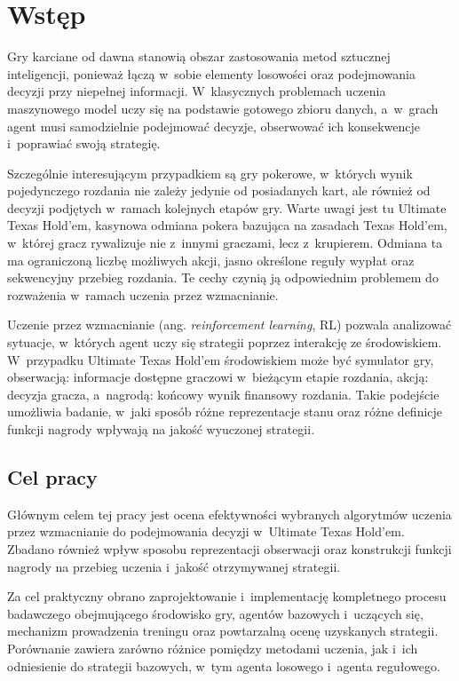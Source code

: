 \chapter{Wstęp}

Gry karciane od dawna stanowią obszar zastosowania metod sztucznej
inteligencji, ponieważ łączą w~sobie elementy losowości oraz podejmowania decyzji przy niepełnej informacji.
W~klasycznych problemach uczenia maszynowego model uczy się na podstawie gotowego zbioru danych,
a~w~grach agent musi samodzielnie podejmować decyzje, obserwować ich konsekwencje i~poprawiać swoją strategię.

Szczególnie interesującym przypadkiem są gry pokerowe, w~których wynik
pojedynczego rozdania nie zależy jedynie od posiadanych kart, ale również od decyzji
podjętych w~ramach kolejnych etapów gry. Warte uwagi jest tu Ultimate Texas Hold’em, kasynowa odmiana pokera bazująca na zasadach Texas Hold’em, w~której gracz rywalizuje
nie z~innymi graczami, lecz z~krupierem. Odmiana ta ma ograniczoną liczbę możliwych akcji,
jasno określone reguły wypłat oraz sekwencyjny przebieg rozdania. Te cechy
czynią ją odpowiednim problemem do rozważenia w~ramach uczenia przez wzmacnianie.

Uczenie przez wzmacnianie (ang. \emph{reinforcement learning}, RL) pozwala
analizować sytuacje, w~których agent uczy się strategii poprzez interakcję ze
środowiskiem. W~przypadku Ultimate Texas Hold’em środowiskiem może być symulator
gry, obserwacją: informacje dostępne graczowi w~bieżącym etapie rozdania, akcją:
decyzja gracza, a~nagrodą: końcowy wynik finansowy rozdania. Takie
podejście umożliwia badanie, w~jaki sposób różne reprezentacje stanu oraz różne definicje funkcji nagrody
wpływają na jakość wyuczonej strategii.

\section{Cel pracy}

Głównym celem tej pracy jest ocena efektywności wybranych algorytmów uczenia przez
wzmacnianie do podejmowania decyzji w~Ultimate Texas Hold’em. Zbadano
również wpływ sposobu reprezentacji obserwacji oraz konstrukcji funkcji
nagrody na przebieg uczenia i~jakość otrzymywanej strategii.

Za cel praktyczny obrano zaprojektowanie i~implementację kompletnego procesu
badawczego obejmującego środowisko gry, agentów bazowych i~uczących się,
mechanizm prowadzenia treningu oraz powtarzalną ocenę uzyskanych strategii.
Porównanie zawiera zarówno różnice pomiędzy metodami uczenia, jak i~ich
odniesienie do strategii bazowych, w~tym agenta losowego i~agenta
regułowego.

